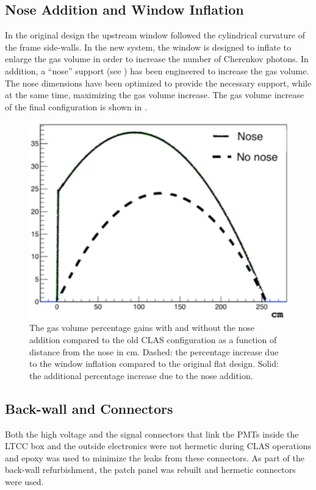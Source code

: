 \subsection{Nose Addition and Window Inflation}

In the original design the upstream window followed the cylindrical curvature of the frame side-walls. In the new
system, the window is designed to inflate to enlarge the gas volume in order to increase the number of Cherenkov
photons. In addition, a ``nose'' support (see ) has been engineered to increase the gas volume. The nose
dimensions have been optimized to provide the necessary support, while at the same time, maximizing the gas volume
increase. The gas volume increase of the final configuration is shown in .

\begin{figure}[h]
	\centering
	\includegraphics[width=0.98\columnwidth, height=0.7\columnwidth]{img/noseVolume.png}
	\caption{The gas volume percentage gains with and without the nose addition compared to the old CLAS
          configuration as a function of distance from the nose in cm. Dashed: the percentage increase due to the
          window inflation compared to the original flat design. Solid: the additional percentage increase due to the
          nose addition.}
	\label{fig:noseVolume}
\end{figure}

\subsection{Back-wall and Connectors}

Both the high voltage and the signal connectors that link the PMTs inside the LTCC box and the outside electronics
were not hermetic during CLAS operations and epoxy was used to minimize the leaks from these connectors. As
part of the back-wall refurbishment, the patch panel was rebuilt and hermetic connectors were used.


